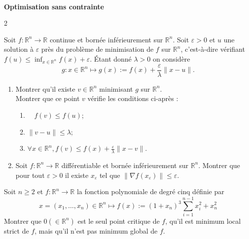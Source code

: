 \quad\\
\begin{center}
	\textbf{{\large Optimisation sans contrainte}}
\end{center}
\begin{multicols}{2}

\begin{exercice}
	Soit $f: \mathbb{R}^{n} \rightarrow \mathbb{R}$ continue et bornée inférieurement sur $\mathbb{R}^{n}$. Soit $\varepsilon>0$ et $u$ une solution à $\varepsilon$ près du problème de minimisation de $f$ sur $\mathbb{R}^{n}$, c'est-à-dire vérifiant $f(u) \leqslant \inf _{x \in \mathbb{R}^{n}} f(x)+\varepsilon$. Étant donné $\lambda>0$ on considère
	\[
	g: x \in \mathbb{R}^{n} \longmapsto g(x):=f(x)+\frac{\varepsilon}{\lambda}\|x-u\| .
	\]
	\begin{enumerate}
		\item Montrer qu'il existe $v \in \mathbb{R}^{n}$ minimisant $g$ sur $\mathbb{R}^{n}$.\\
		Montrer que ce point $v$ vérifie les conditions ci-après :
		\begin{enumerate}
			\item $\quad f(v) \leqslant f(u)$;
			\item $\|v-u\| \leqslant \lambda$;
			\item $\forall x \in \mathbb{R}^{n}, f(v) \leqslant f(x)+\frac{\varepsilon}{\lambda}\|x-v\|$.
		\end{enumerate}
		\item Soit $f: \mathbb{R}^{n} \rightarrow \mathbb{R}$ différentiable et bornée inférieurement sur $\mathbb{R}^{n}$.
		Montrer que pour tout $\varepsilon>0$ il existe $x_{\varepsilon}$ tel que $\left\|\nabla f\left(x_{\varepsilon}\right)\right\| \leqslant \varepsilon$.
	\end{enumerate}
\end{exercice}

\begin{exercice}
	Soit $n \geqslant 2$ et $f: \mathbb{R}^{n} \rightarrow \mathbb{R}$ la fonction polynomiale de degré cinq définie par
	\[
	x=\left(x_{1}, \ldots, x_{n}\right) \in \mathbb{R}^{n} \longmapsto f(x):=\left(1+x_{n}\right)^{3} \sum_{i=1}^{n-1} x_{i}^{2}+x_{n}^{2}
	\]
	Montrer que $0\left(\in \mathbb{R}^{n}\right)$ est le seul point critique de $f$, qu'il est minimum local strict de $f$, mais qu'il n'est pas minimum global de $f$.
\end{exercice}


\end{multicols}
